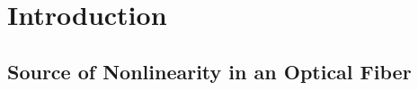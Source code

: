 
\renewcommand{\thechapter}{1}

\chapter{Introduction}

\section{Source of Nonlinearity in an Optical Fiber}

